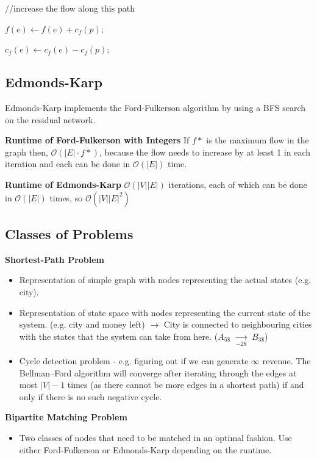 \documentclass[10pt,landscape,a4paper, table]{extarticle}
\begin{document}
\begin{multicols*}{3}
{\begin{algorithm}[H]
{        //increase the flow along this path
        
         {
            $f(e) \leftarrow f(e) + c_f(p)$;
            
            $c_f(e) \leftarrow c_f(e) - c_f(p)$;
            
        }
    }
\end{algorithm}}

\subsection{Edmonds-Karp}
Edmonds-Karp implements the Ford-Fulkerson algorithm by using a BFS search on the residual network.

\textbf{Runtime of Ford-Fulkerson with Integers}
If $f*$ is the maximum flow in the graph then,
$\mathcal{O}(|E| \cdot f*)$, because the flow needs to increase by at least 1 in each iteration and each can be done in $\mathcal{O}(|E|)$ time. 

\textbf{Runtime of Edmonds-Karp}
$\mathcal{O}(|V||E|)$ iterations, each of which can be done in $\mathcal{O}( |E|)$ times, so $\mathcal{O}(|V||E|^2)$

\subsection{Classes of Problems}

\textbf{Shortest-Path Problem}
\begin{itemize}
    \item Representation of simple graph with nodes representing the actual states (e.g. city).
    \item Representation of state space with nodes representing the current state of the system. (e.g. city and money left) $\rightarrow$ City is connected to neighbouring cities with the states that the system can take from here. ($A_{5\$}$ $\underset{-2\$}{\rightarrow}$ $B_{3\$}$)
    \item Cycle detection problem - e.g. figuring out if we can generate $\infty$ revenue. The Bellman–Ford algorithm will converge after iterating through the edges at most $| V | -1$ times (as there cannot be more edges in a shortest path) if and only if there is no such negative cycle. 
\end{itemize}

\textbf{Bipartite Matching Problem}
\begin{itemize}
    \item Two classes of nodes that need to be matched in an optimal fashion. Use either Ford-Fulkerson or Edmonds-Karp depending on the runtime. 
\end{itemize}


\end{multicols*}
\end{document}

